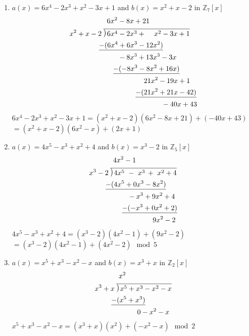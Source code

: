 \documentclass[12pt]{article}
\newcommand\Mydiv[2]{%
$\strut#1$\kern.25em\smash{\raise.3ex\hbox{$\big)$}}$\mkern-8mu
        \overline{\enspace\strut#2}$}
\begin{document}
\begin{enumerate}[label=\textbf{\arabic*}.]
\begin{enumerate}
        \item $a(x) = 6x^4-2x^3+x^2-3x+1$ and $b(x) = x^2+x-2$ in $\mathbb{Z}_{7}[x]$
    \begin{align*}
        &\qquad \qquad \quad \; 6x^2-8x+21 \\
        &\text{\Mydiv{x^2+x-2}{6x^4-2x^3 + \ \quad \! x^2-3x+1}} \\
        &\qquad \qquad \, \underline{-(6x^4+6x^3-12x^2)} \\
        &\qquad \qquad \qquad \; \; \; -8x^3+13x^3-3x \\
        &\qquad \qquad \qquad \, \underline{-(-8x^3-8x^2+16x)} \\
        &\qquad \qquad \qquad \qquad \qquad \ \, 21x^2-19x+1 \\
        &\qquad \qquad \qquad \qquad \quad \ \underline{-(21x^2+21x-42)} \\
        & \qquad \qquad \qquad \qquad \qquad \qquad \quad -40x+43
    \end{align*}
    $6x^4-2x^3+x^2-3x+1 = (x^2+x-2)(6x^2-8x+21)+(-40x+43)$ \\
    $=(x^2+x-2)(6x^2-x)+(2x+1)$

    \item $a(x) = 4x^5-x^3+x^2+4$ and $b(x) = x^3-2$ in $\mathbb{Z}_{5}[x]$
    \begin{align*}
        & \qquad \quad \ \: \! 4x^2-1\\
        &\text{\Mydiv{x^3-2}{4x^5 \ - \ x^3 \, + \ x^2+4}} \\
        &\qquad \ \underline{-(4x^5+0x^3-8x^2)} \\
        &\qquad \qquad \quad \; \, -x^3+9x^2+4 \\
        &\qquad \qquad \ \ \underline{-(-x^3+0x^2+2)} \\
        &\qquad \qquad \qquad \qquad \quad 9x^2-2
    \end{align*}
    $4x^5-x^3+x^2+4 = (x^3-2)(4x^2-1) + (9x^2-2)$ \\
    $=(x^3-2)(4x^2-1)+(4x^2-2) \mod{5}$

    \item $a(x) = x^5+x^3-x^2-x$ and $b(x) = x^3+x$ in $\mathbb{Z}_{2}[x]$
    \begin{align*}
        & \qquad \quad \ \: \! x^2\\
        &\text{\Mydiv{x^3+x}{x^5+x^3-x^2-x}} \\
        &\qquad \ \underline{-(x^5+x^3)} \\
        &\qquad \qquad \qquad 0-x^2-x
    \end{align*}
    $x^5+x^3-x^2-x = (x^3+x)(x^2) + (-x^2-x) \mod{2}$
    \end{enumerate}
\end{enumerate}
\end{document}
